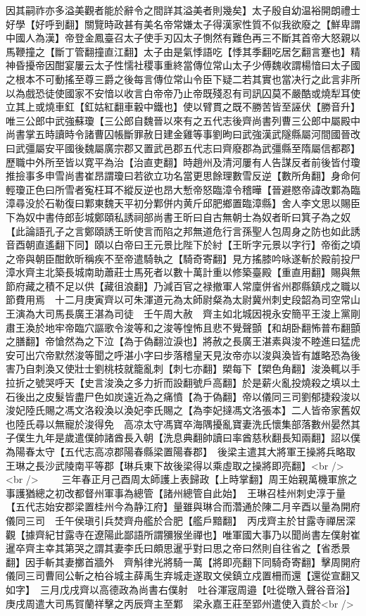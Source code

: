 因其嗣祚亦多溢美觀者能於辭令之間詳其溢美者則幾矣】太子殷自幼温裕開朗禮士好學【好呼到翻】關覽時政甚有美名帝常嫌太子得漢家性質不似我欲廢之【鮮卑謂中國人為漢】帝登金鳳臺召太子使手刃囚太子惻然有難色再三不斷其首帝大怒親以馬鞭撞之【斷丁管翻撞直江翻】太子由是氣悸語吃【悸其季翻吃居乞翻言蹇也】精神昏擾帝因酣宴屢云太子性懦社稷事重終當傳位常山太子少傅魏收謂楊愔曰太子國之根本不可動搖至尊三爵之後每言傳位常山令臣下疑二若其實也當决行之此言非所以為戲恐徒使國家不安愔以收言白帝帝乃止帝既殘忍有司訊囚莫不嚴酷或燒犁耳使立其上或燒車釭【釭姑紅翻車轂中鐵也】使以臂貫之既不勝苦皆至誣伏【勝音升】唯三公郎中武強蘇瓊【三公郎自魏晉以來有之五代志後齊尚書列曹三公郎中屬殿中尚書掌五時讀時令諸曹囚帳斷罪赦日建金雞等事劉昫曰武強漢武隧縣屬河間國晉改曰武彊屬安平國後魏屬廣宗郡又置武邑郡五代志曰齊廢郡為武彊縣至隋屬信都郡】歷職中外所至皆以寛平為治【治直吏翻】時趙州及清河屢有人告謀反者前後皆付瓊推撿事多申雪尚書崔昂謂瓊曰若欲立功名當更思餘理數雪反逆【數所角翻】身命何輕瓊正色曰所雪者寃枉耳不縱反逆也昂大慙帝怒臨漳令稽曄【晉避愍帝諱改鄴為臨漳尋没於石勒復曰鄴東魏天平初分鄴併内黄斤邱肥鄉置臨漳縣】舍人李文思以賜臣下為奴中書侍郎彭城鄭頤私誘祠部尚書王昕曰自古無朝士為奴者昕曰箕子為之奴【此論語孔子之言鄭頤誘王昕使言而陷之邦無道危行言孫聖人包周身之防也如此誘音酉朝直遙翻下同】頤以白帝曰王元景比陛下於紂【王昕字元景以字行】帝銜之頃之帝與朝臣酣飲昕稱疾不至帝遣騎執之【騎奇寄翻】見方搖膝吟咏遂斬於殿前投尸漳水齊主北築長城南助蕭莊士馬死者以數十萬計重以修築臺殿【重直用翻】賜與無節府藏之積不足以供【藏徂浪翻】乃減百官之禄撤軍人常廩併省州郡縣鎮戍之職以節費用焉　十二月庚寅齊以可朱渾道元為太師尉粲為太尉冀州刺史段韶為司空常山王演為大司馬長廣王湛為司徒　壬午周大赦　齊主如北城因視永安簡平王浚上黨剛肅王渙於地牢帝臨穴謳歌令浚等和之浚等惶怖且悲不覺聲顫【和胡卧翻怖普布翻顫之膳翻】帝愴然為之下泣【為于偽翻泣淚也】將赦之長廣王湛素與浚不睦進曰猛虎安可出穴帝默然浚等聞之呼湛小字曰步落稽皇天見汝帝亦以浚與渙皆有雄略恐為後害乃自刺渙又使壯士劉桃枝就籠亂刺【刺七亦翻】槊每下【槊色角翻】浚渙輒以手拉折之號哭呼天【史言浚渙之多力折而設翻號戶高翻】於是薪火亂投燒殺之填以土石後出之皮髮皆盡尸色如炭遠近為之痛憤【為于偽翻】帝以儀同三司劉郁捷殺浚以浚妃陸氏賜之馮文洛殺渙以渙妃李氏賜之【為李妃撻馮文洛張本】二人皆帝家舊奴也陸氏尋以無寵於浚得免　高凉太守馮寶卒海隅擾亂寶妻洗氏懷集部落數州晏然其子僕生九年是歲遣僕帥諸酋長入朝【洗息典翻帥讀曰率酋慈秋翻長知兩翻】詔以僕為陽春太守【五代志高凉郡陽春縣梁置陽春郡】　後梁主遣其大將軍王操將兵略取王琳之長沙武陵南平等郡【琳兵東下故後梁得以乘虛取之操將即亮翻】<br />
<br />
　　三年春正月己酉周太師護上表歸政【上時掌翻】周王始親萬機軍旅之事護猶總之初改都督州軍事為總管【諸州總管自此始】　王琳召桂州刺史淳于量【五代志始安郡梁置桂州今為静江府】量雖與琳合而濳通於陳二月辛酉以量為開府儀同三司　壬午侯瑱引兵焚齊舟艦於合肥【艦戶黯翻】　丙戌齊主於甘露寺禪居深觀【據齊紀甘露寺在遼陽此鄙語所謂獼猴坐禪也】唯軍國大事乃以聞尚書左僕射崔暹卒齊主幸其第哭之謂其妻李氏曰頗思暹乎對曰思之帝曰然則自往省之【省悉景翻】因手斬其妻擲首牆外　齊斛律光將騎一萬【將即亮翻下同騎奇寄翻】擊周開府儀同三司曹囘公斬之柏谷城主薛禹生弃城走遂取文侯鎮立戍置柵而還【還從宣翻又如字】　三月戊戌齊以高德政為尚書右僕射　吐谷渾宼周邉【吐從暾入聲谷音浴】庚戌周遣大司馬賀蘭祥擊之丙辰齊主至鄴　梁永嘉王莊至郢州遣使入貢於<br />
